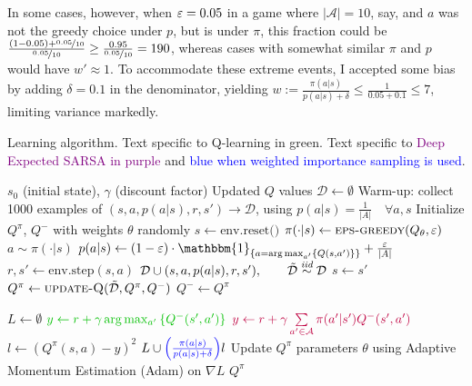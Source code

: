\documentclass{article}
\begin{document}
In some cases, however, when \(\varepsilon=0.05\) in a game where \(|\mathcal{A}| = 10\), say, and \(a\) was not the greedy choice under \(p\), but is under \(\pi\), this fraction could be \(\frac{(1-0.05) + \nicefrac{0.05}{10}}{\nicefrac{0.05}{10}} \ge \frac{0.95}{\nicefrac{0.05}{10}} = 190\), whereas cases with somewhat similar \(\pi\) and \(p\) would have \(w' \approx 1\). To accommodate these extreme events, I accepted some bias by adding \(\delta = 0.1\) in the denominator, yielding \(w := \frac{\pi(a|s)}{p(a|s) + \delta} \le \frac{1}{0.05 + 0.1} \le 7\), limiting variance markedly.

\begin{algorithm}
    \caption{Learning algorithm. Text specific to \textcolor{dgreen}{Q-learning in green}. Text specific to \textcolor{purple}{Deep Expected SARSA in purple} and \textcolor{blue}{blue when weighted importance sampling is used}.}
    \begin{algorithmic}[1]
        \Require $s_0$ (initial state), $\gamma$ (discount factor)
        \Ensure Updated $Q$ values
        \State \(\mathcal{D} \gets \emptyset\)
        \State Warm-up: collect 1000 examples of $(s, a, p(a|s), r, s') \rightarrow \mathcal{D}$, using $p(a|s) = \frac{1}{|A|} \quad \forall a, s$
        \State Initialize $Q^\pi$, $Q^-$ with weights \(\theta\) randomly
        \Repeat
            \State $s \gets \text{env.reset()}$
            \Repeat
                \State $\pi(\cdot | s) \gets \Call{eps-greedy}{Q_\theta, \eps}$
                \State $a \sim \pi(\cdot|s)$
                \State $p(a|s) \gets (1 - \eps) \cdot \mathbbm{1}_{\set{a = \arg\max_{a'}\set{Q(s,a')}}} + \frac{\eps}{|A|}$
                \State $r, s' \gets \text{env.step}(s, a)$
                \State $\mathcal{D} \cup (s, a, p(a|s), r, s'),\qquad \tilde{\mathcal{D}} \overset{\textit{iid}}{\sim}\mathcal{D}$
                \State $s \gets s'$
                \State $Q^\pi \gets \Call{update-Q}{\tilde{\mathcal{D}}, Q^\pi, Q^-}$
                    \State $Q^- \gets Q^\pi$
                \EndIf
        
            \State $L \gets \emptyset$
                \State $\textcolor{dgreen}{y \gets r + \gamma \arg\max_{a'}\set{Q^-(s',a')}}$
                \State $\textcolor{purple}{y \gets r + \gamma \sum\limits_{a' \in \mathcal{A}} \pi(a' | s') Q^-(s', a')}$
                \State $l \gets (Q^\pi(s, a) - y)^2$
                \State $L \cup \textcolor{blue}{\left( \frac{\pi(a|s)}{p(a|s) + \delta} \right)} l$ %
                \EndFor
            \State Update $Q^\pi$ parameters \(\theta\) using Adaptive Momentum Estimation (Adam) on \(\nabla L\)
            \State \Return $Q^\pi$
        \EndProcedure
    \end{algorithmic}
\end{algorithm}
\end{document}
